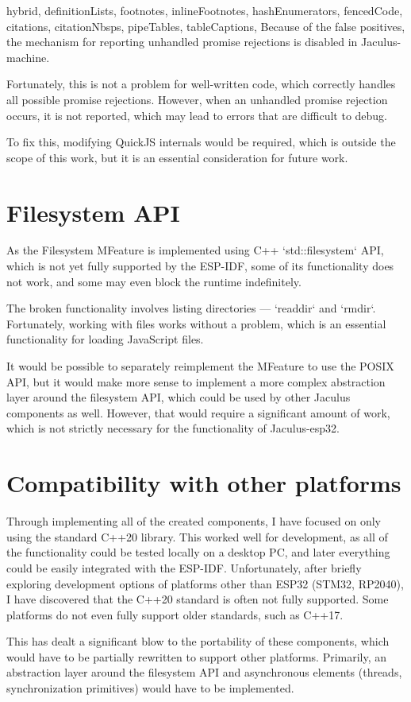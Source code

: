 \begin{markdown*}{%
  hybrid,
  definitionLists,
  footnotes,
  inlineFootnotes,
  hashEnumerators,
  fencedCode,
  citations,
  citationNbsps,
  pipeTables,
  tableCaptions,
}
Because of the false positives, the mechanism for reporting unhandled promise rejections is disabled in Jaculus-machine.

Fortunately, this is not a problem for well-written code, which correctly handles all possible promise rejections. However, when an unhandled promise rejection occurs, it is not reported, which may lead to errors that are difficult to debug.

To fix this, modifying QuickJS internals would be required, which is outside the scope of this work, but it is an essential consideration for future work.


\section{Filesystem API}

As the Filesystem MFeature is implemented using C++ `std::filesystem` API, which is not yet fully supported by the ESP-IDF, some of its functionality does not work, and some may even block the runtime indefinitely.

The broken functionality involves listing directories --- `readdir` and `rmdir`. Fortunately, working with files works without a problem, which is an essential functionality for loading JavaScript files.

It would be possible to separately reimplement the MFeature to use the POSIX API, but it would make more sense to implement a more complex abstraction layer around the filesystem API, which could be used by other Jaculus components as well. However, that would require a significant amount of work, which is not strictly necessary for the functionality of Jaculus-esp32.

\section{Compatibility with other platforms}

Through implementing all of the created components, I have focused on only using the standard C++20 library. This worked well for development, as all of the functionality could be tested locally on a desktop PC, and later everything could be easily integrated with the ESP-IDF. Unfortunately, after briefly exploring development options of platforms other than ESP32 (STM32, RP2040), I have discovered that the C++20 standard is often not fully supported. Some platforms do not even fully support older standards, such as C++17.

This has dealt a significant blow to the portability of these components, which would have to be partially rewritten to support other platforms. Primarily, an abstraction layer around the filesystem API and asynchronous elements (threads, synchronization primitives) would have to be implemented.


\end{markdown*}
